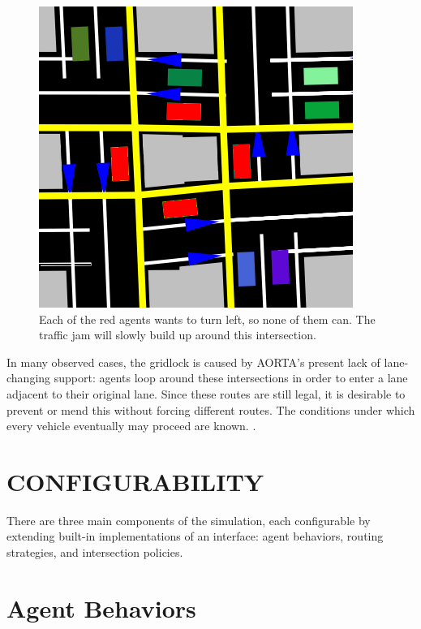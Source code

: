 \documentclass[letterpaper, 10 pt, conference]{ieeeconf}  %
\begin{document}
\begin{figure}[h]
  \centering \includegraphics[scale=0.25]{gridlock.png}
  \caption{Each of the red agents wants to turn left, so none of them
           can. The traffic jam will slowly build up around this intersection.}
  \label{fig:gridlock}
  \vspace{-10pt}
\end{figure}

In many observed cases, the gridlock is caused by AORTA's present lack of
lane-changing support: agents loop around these intersections in order to enter
a lane adjacent to their original lane. Since these routes are still legal, it
is desirable to prevent or mend this without forcing different routes. The
conditions under which every vehicle eventually may proceed are known.
\cite{AAAI11-au}.


\section{CONFIGURABILITY}
\label{sec:config}

There are three main components of the simulation, each configurable by
extending built-in implementations of an interface: agent behaviors, routing
strategies, and intersection policies.

\section{Agent Behaviors}
\end{document}

